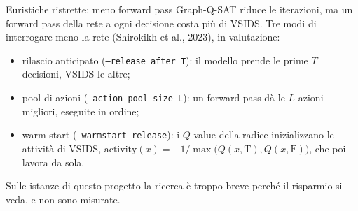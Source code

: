\documentclass[aspectratio=169]{beamer}
\newcommand{\T}[2]{#2}
\newcommand{\T}[2]{#1}
\begin{document}
\begin{frame}{\T{Restricted heuristics: fewer forward passes}{Euristiche ristrette: meno forward pass}}
  \T{Graph-Q-SAT reduces the iterations, but a forward pass of the network at each decision
  costs more than VSIDS. Three ways of querying the network less (Shirokikh et al., 2023),
  at evaluation time:}%
  {Graph-Q-SAT riduce le iterazioni, ma un forward pass della rete a ogni decisione costa pi\`u
  di VSIDS. Tre modi di interrogare meno la rete (Shirokikh et al., 2023), in valutazione:}
  \begin{itemize}
    \item \T{early release (\texttt{--release\_after T}): the model takes the first $T$
          decisions, VSIDS the others;}%
          {rilascio anticipato (\texttt{--release\_after T}): il modello prende le prime $T$
          decisioni, VSIDS le altre;}
    \item \T{action pool (\texttt{--action\_pool\_size L}): one forward pass gives the $L$
          best actions, executed in order;}%
          {pool di azioni (\texttt{--action\_pool\_size L}): un forward pass d\`a le $L$ azioni
          migliori, eseguite in ordine;}
    \item \T{warm start (\texttt{--warmstart\_release}): the $Q$-values of the root
          initialize the activities of VSIDS,}%
          {warm start (\texttt{--warmstart\_release}): i $Q$-value della radice
          inizializzano le attivit\`a di VSIDS,}
          $\text{activity}(x)=-1/\max\big(Q(x,\text{T}),Q(x,\text{F})\big)$,
          \T{which then runs unaided.}{che poi lavora da sola.}
  \end{itemize}
  \T{On the instances of this project the search is too short for the saving to show, and
  they are not measured.}{Sulle istanze di questo progetto la ricerca \`e troppo breve perch\'e
  il risparmio si veda, e non sono misurate.}
\end{frame}
\end{document}
